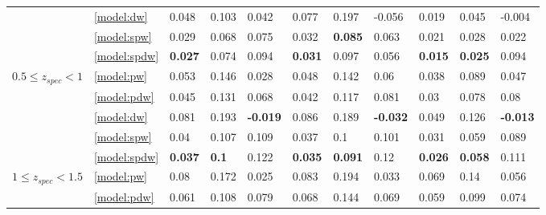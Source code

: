 \documentclass[fleqn,usenatbib]{mnras}
\begin{document}
\begin{table}
\begin{tabular}{lllllllllll}
                              & \ref{model:dw} &                0.048 &           0.103 &            0.042 &            0.077 &           0.197 &           -0.056 &            0.019 &           0.045 &           -0.004 \\
                              & \ref{model:spw} &                0.029 &           0.068 &            0.075 &            0.032 &  \textbf{0.085} &            0.063 &            0.021 &           0.028 &            0.022 \\
                              & \ref{model:spdw} &       \textbf{0.027} &           0.074 &            0.094 &   \textbf{0.031} &           0.097 &            0.056 &   \textbf{0.015} &  \textbf{0.025} &            0.094 \\
\hline
            $0.5 \leq z_{spec} < 1$ & \ref{model:pw} &                0.053 &           0.146 &            0.028 &            0.048 &           0.142 &             0.06 &            0.038 &           0.089 &            0.047 \\
                              & \ref{model:pdw} &                0.045 &           0.131 &            0.068 &            0.042 &           0.117 &            0.081 &             0.03 &           0.078 &             0.08 \\
                              & \ref{model:dw} &                0.081 &           0.193 &  \textbf{-0.019} &            0.086 &           0.189 &  \textbf{-0.032} &            0.049 &           0.126 &  \textbf{-0.013} \\
                              & \ref{model:spw} &                 0.04 &           0.107 &            0.109 &            0.037 &             0.1 &            0.101 &            0.031 &           0.059 &            0.089 \\
                              & \ref{model:spdw} &       \textbf{0.037} &    \textbf{0.1} &            0.122 &   \textbf{0.035} &  \textbf{0.091} &             0.12 &   \textbf{0.026} &  \textbf{0.058} &            0.111 \\
\hline
            $1 \leq z_{spec} < 1.5$ & \ref{model:pw} &                 0.08 &           0.172 &            0.025 &            0.083 &           0.194 &            0.033 &            0.069 &            0.14 &            0.056 \\
                              & \ref{model:pdw} &                0.061 &           0.108 &            0.079 &            0.068 &           0.144 &            0.069 &            0.059 &           0.099 &            0.074 \\

\end{tabular}
\end{table}
\end{document}
